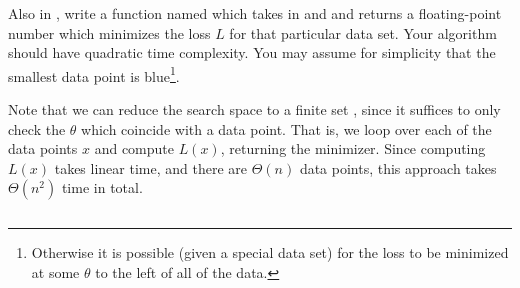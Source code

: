 \begin{progprob}
\begin{subprobset}
\begin{subprob}
        \end{subprob}

        \begin{subprob}
            Also in , write a function named 
            which takes in  and  and returns a floating-point
            number which minimizes the loss $L$ for that particular data set.
            Your algorithm should have quadratic time complexity. You may
            assume for simplicity that the smallest data point is
            blue\footnote{Otherwise it is possible (given a special data set) for the
                loss to be minimized at some $\theta$ to the left of all of the
            data.}.

            \begin{soln}
                Note that we can reduce the search space to a finite set ,
                since it suffices to only check the $\theta$ which coincide
                with a data point.  That is, we loop over each of the data
                points $x$ and compute $L(x)$, returning the minimizer.
                Since computing $L(x)$ takes linear time, and there are
                $\Theta(n)$ data points, this approach takes $\Theta(n^2)$
                time in total.

                \inputminted{python}{\thisdir/include-solution/minimize_ell.py}
            \end{soln}
            
        \end{subprob}


        

    \end{subprobset}

\end{progprob}
